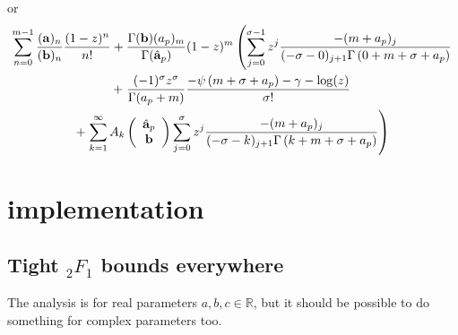 \documentclass[10pt]{article}
\numberwithin{equation}{section}
\begin{document}
or
\begin{equation*}
\begin{gathered}
\sum_{n=0}^{m-1}\frac{(\mathbf{a})_n}{(\mathbf{b})_n} \frac{(1-z)^n}{n!}+ \frac{\Gamma(\bold{b})(a_p)_m}{\Gamma(\hat{\bold{a}}_p)} (1-z)^m \left(\sum_{j=0}^{\sigma-1} z^j\frac{-(m+a_p)_j}{(-\sigma-0)_{j+1} \Gamma
   \left(0+m+\sigma +a_p\right)} \right.\\
+ \left. \frac{(-1)^\sigma z^\sigma}{\Gamma(a_p+m)} \frac{-\psi \left(m+\sigma+a_p\right)-\gamma-\log(z) }{\sigma !} \right.\\
+ \left. \sum_{k=1}^{\infty} {A_k\left(\begin{array}{c} \hat{\bold{a}}_p \\ \bold{b} \end{array}\right)} \sum_{j=0}^{\sigma} z^j\frac{-(m+a_p)_j}{(-\sigma-k)_{j+1} \Gamma
   \left(k+m+\sigma +a_p\right)} \right)
\end{gathered}
\end{equation*}




\section{implementation}

\subsection{Tight ${}_2 F_1$ bounds everywhere}
The analysis is for real parameters $a,b,c \in \mathbb{R}$, but it should be possible to do something for complex parameters too.
\end{document}
